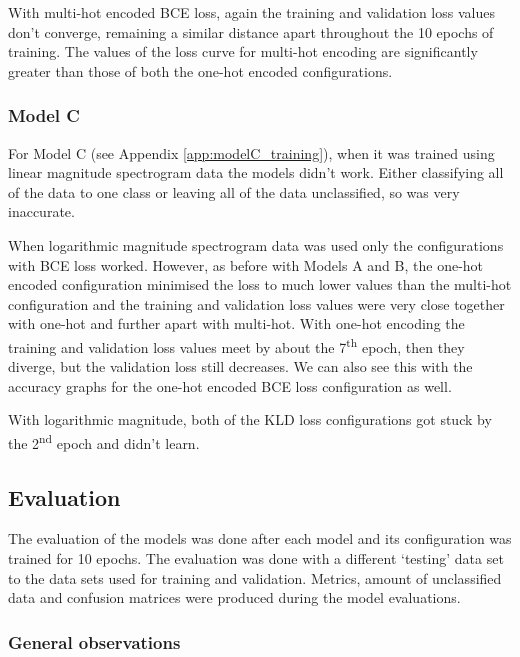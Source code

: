 \documentclass[12pt]{article}
\begin{document}
	With multi-hot encoded BCE loss, again the training and validation loss values don't converge, remaining a similar distance apart throughout the 10 epochs of training. The values of the loss curve for multi-hot encoding are significantly greater than those of both the one-hot encoded configurations.\medskip
	
	\subsubsection{Model C}
	\label{sec:training_analysis_modelC}
	
	For Model C (see Appendix \ref{app:modelC_training}), when it was trained using linear magnitude spectrogram data the models didn't work. Either classifying all of the data to one class or leaving all of the data unclassified, so was very inaccurate.\medskip
	
	When logarithmic magnitude spectrogram data was used only the configurations with BCE loss worked. However, as before with Models A and B, the one-hot encoded configuration minimised the loss to much lower values than the multi-hot configuration and the training and validation loss values were very close together with one-hot and further apart with multi-hot. With one-hot encoding the training and validation loss values meet by about the 7\textsuperscript{th} epoch, then they diverge, but the validation loss still decreases. We can also see this with the accuracy graphs for the one-hot encoded BCE loss configuration as well.\medskip
	
	With logarithmic magnitude, both of the KLD loss configurations got stuck by the 2\textsuperscript{nd} epoch and didn't learn.\medskip
	
	\subsection{Evaluation}
	\label{sec:evaluation_analysis}
    The evaluation of the models was done after each model and its configuration was trained for 10 epochs. The evaluation was done with a different `testing' data set to the data sets used for training and validation. Metrics, amount of unclassified data and confusion matrices were produced during the model evaluations.\medskip
    
    \subsubsection{General observations}
    \label{sec:evaluation_general}
    
\end{document}
